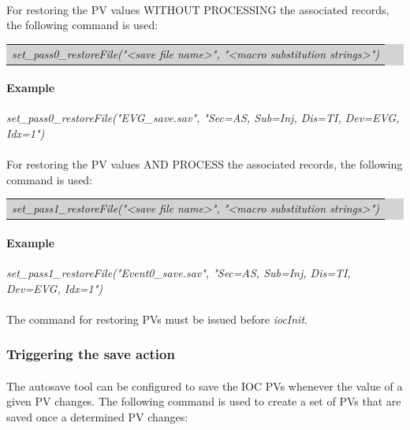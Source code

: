 \documentclass[openany]{article}
\begin{document}
			\paragraph{} For restoring the PV values WITHOUT PROCESSING the associated records, the following command is used:

			\bigskip
			\colorbox{lightgray}{
				\begin{tabularx}{0.9\textwidth}{X}
				\emph{set\_pass0\_restoreFile("\textless save file name\textgreater", "\textless macro substitution strings\textgreater")}
				\end{tabularx}
			}

			\paragraph{Example} \emph{set\_pass0\_restoreFile("EVG\_save.sav", "Sec=AS, Sub=Inj, Dis=TI, Dev=EVG, Idx=1")}

			\paragraph{} For restoring the PV values AND PROCESS the associated records, the following command is used:

			\bigskip
			\colorbox{lightgray}{
				\begin{tabularx}{0.9\textwidth}{X}
				\emph{set\_pass1\_restoreFile("\textless save file name\textgreater", "\textless macro substitution strings\textgreater")}
				\end{tabularx}
			}

			\paragraph{Example} \emph{set\_pass1\_restoreFile("Event0\_save.sav", "Sec=AS, Sub=Inj, Dis=TI, Dev=EVG, Idx=1")}

			\paragraph{} {\color{red}The command for restoring PVs must be issued before \emph{iocInit}.}

		\subsubsection{Triggering the save action}

			\paragraph{} The autosave tool can be configured to save the IOC PVs whenever the value of a given PV changes. The following command is used to create a set of PVs that are saved once a determined PV changes:
\end{document}
